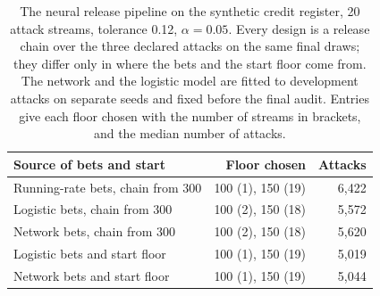 \begin{table}[t]
\centering
\caption{The neural release pipeline on the synthetic credit register, 20 attack streams, tolerance 0.12, $\alpha=0.05$. Every design is a release chain over the three declared attacks on the same final draws; they differ only in where the bets and the start floor come from. The network and the logistic model are fitted to development attacks on separate seeds and fixed before the final audit. Entries give each floor chosen with the number of streams in brackets, and the median number of attacks.}
\label{tab:neural-pipeline}
\small
\begin{tabular}{lrr}
\toprule
Source of bets and start & Floor chosen & Attacks \\
\midrule
Running-rate bets, chain from 300 & 100 (1), 150 (19) & 6{,}422 \\
Logistic bets, chain from 300 & 100 (2), 150 (18) & 5{,}572 \\
Network bets, chain from 300 & 100 (2), 150 (18) & 5{,}620 \\
Logistic bets and start floor & 100 (1), 150 (19) & 5{,}019 \\
Network bets and start floor & 100 (1), 150 (19) & 5{,}044 \\
\bottomrule
\end{tabular}
\end{table}
